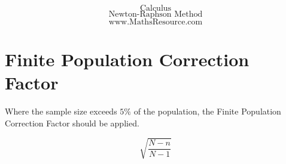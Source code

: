 
\usepackage{amsmath}
\usepackage{amssymb}
\usepackage{graphics}


\begin{frame}


{
\huge
\[ \mbox{Calculus} \]
\[ \mbox{Newton-Raphson Method} \]
}
{
\Large
\[ \mbox{www.MathsResource.com} \]
}
\end{frame}%




\section{Finite Population Correction Factor}

Where the sample size exceeds $5\%$ of the population, the Finite Population Correction Factor should be applied. 

\[ \sqrt{\frac{N-n}{N-1}} \]
